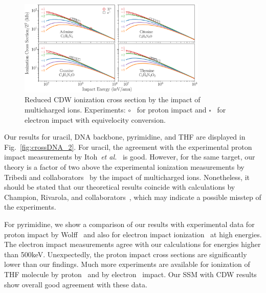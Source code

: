 \documentclass[preprint,showpacs]{revtex4}
\begin{document}
\begin{figure}[t!]
\centering
\includegraphics[width=0.8\textwidth]{figuras/adn1.eps}
\caption{Reduced CDW ionization cross section by the impact of 
multicharged ions. Experiments: \mbox{\Large$\circ$}~\cite{iriki2011} 
for proton impact and $\square$~\cite{rahman2016} for electron impact 
with equivelocity conversion.}
\label{fig:crossDNA_1}
\end{figure} 

Our results for uracil, DNA backbone, pyrimidine, and THF are displayed 
in Fig.~\ref{fig:crossDNA_2}. For uracil, the agreement with the 
experimental proton impact measurements by 
Itoh~{\it et al.}~\cite{itoh2013} is good.
However, for the same target, our theory is a factor of two above 
the experimental ionization measurements by Tribedi and 
collaborators~\cite{agnihotri2012,agnihotri2013} by the impact of 
multicharged ions.
Nonetheless, it should be stated that our theoretical results coincide 
with calculations by Champion, Rivarola, and 
collaborators~\cite{agnihotri2012,champion2012}, which may indicate a 
possible misstep of the experiments. 

For pyrimidine, we show a comparison of our results with experimental 
data for proton impact by Wolff~\cite{wolff2014} and also for electron
impact ionization~\cite{bug2017} at high energies. 
The electron impact measurements 
agree with our calculations for energies higher than 500keV. 
Unexpectedly, the proton impact cross sections are significantly lower 
than our findings. 
Much more experiments are available for ionization of THF molecule by 
proton~\cite{wang2016} and by electron~\cite{bug2017,wolf2019,fuss2009} 
impact. Our SSM with CDW results show overall good agreement with these
data.
\end{document}
